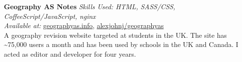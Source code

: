 \textbf{Geography AS Notes}  \newline
\textit{Skills Used: HTML, SASS/CSS, CoffeeScript/JavaScript, nginx}\\
\textit{Available at:} \href{https://geographyas.info}{geographyas.info}, \href{https://github.com/\myweb/geographyas}{alexjohnj/geographyas} \\
A geography revision website targeted at students in the UK. The site has
\textasciitilde{}75,000 users a month and has been used by schools in the UK and
Canada. I acted as editor and developer for four years.

